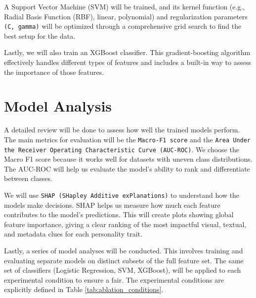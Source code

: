 A Support Vector Machine (SVM) will be trained, and its kernel function (e.g., Radial Basis Function (RBF), linear, polynomial) and regularization parameters \texttt{(C, gamma)} will be optimized through a comprehensive grid search to find the best setup for the data.

Lastly, we will also train an XGBoost classifier. This gradient-boosting algorithm effectively handles different types of features and includes a built-in way to assess the importance of those features.

\section{Model Analysis}
\label{subsec:analysis}
A detailed review will be done to assess how well the trained models perform. The main metrics for evaluation will be the \texttt{Macro-F1 score} and the \texttt{Area Under the Receiver Operating Characteristic Curve (AUC-ROC)}. We choose the Macro F1 score because it works well for datasets with uneven class distributions. The AUC-ROC will help us evaluate the model's ability to rank and differentiate between classes.

We will use \texttt{SHAP (SHapley Additive exPlanations)} to understand how the models make decisions. SHAP helps us measure how much each feature contributes to the model's predictions. This will create plots showing global feature importance, giving a clear ranking of the most impactful visual, textual, and metadata clues for each personality trait.

Lastly, a series of model analyses will be conducted. This involves training and evaluating separate models on distinct subsets of the full feature set. The same set of classifiers (Logistic Regression, SVM, XGBoost), will be applied to each experimental condition to ensure a fair. The experimental conditions are explicitly defined in Table \ref{tab:ablation_conditions}.

